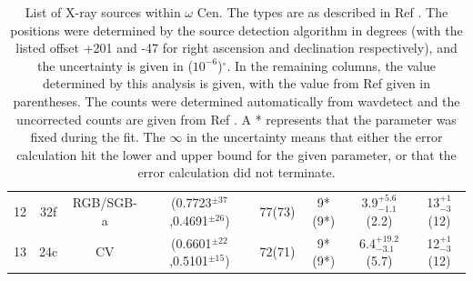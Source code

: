 \documentclass[aps,
                pra,  
                a4paper, 
                amsmath, 
                amssymb, 
                preprint,
                tightenlines,  
                amsfonts,
                nofootinbib,
                notitlepage
            ]{revtex4-2}
\begin{document}
\begin{center}
\begin{table}
\begin{tabular}{cccccccc}
        12 & 32f & RGB/SGB-a & (0.7723$^{\pm37}$,0.4691$^{\pm26}$) & 77(73) & 9*(9*) & 3.9$^{+5.6}_{-1.1}$(2.2) & 13$^{+1}_{-3}$(12)\\
        13 & 24c & CV & (0.6601$^{\pm22}$,0.5101$^{\pm15}$) & 72(71) & 9*(9*) & 6.4$^{+19.2}_{-3.1}$(5.7) & 12$^{+1}_{-3}$(12)\\
    \end{tabular}
    \caption{List of X-ray sources within $\omega$ Cen. The types are as described in Ref \cite{Henleywillis2018}. The positions were determined by the source detection algorithm in degrees (with the listed offset +201 and -47 for right ascension and declination respectively), and the uncertainty is given in ($10^{-6}$)$^\circ$. In the remaining columns, the value determined by this analysis is given, with the value from Ref \cite{Henleywillis2018} given in parentheses. The counts were determined automatically from {\sc wavdetect} and the uncorrected counts are given from Ref \cite{Henleywillis2018}. A * represents that the parameter was fixed during the fit. The $\infty$ in the uncertainty means that either the error calculation hit the lower and upper bound for the given parameter, or that the error calculation did not terminate.}
    \label{tab:fitting-results}
    \end{table}
\end{center}
\end{document}
